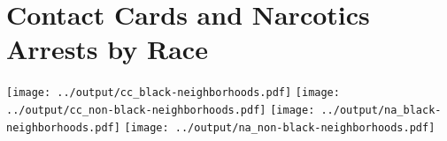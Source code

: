 \documentclass[]{article}
\begin{document}
\section*{Contact Cards and Narcotics Arrests by Race}
\texttt{[image: ../output/cc\_black-neighborhoods.pdf]}
\texttt{[image: ../output/cc\_non-black-neighborhoods.pdf]}
\texttt{[image: ../output/na\_black-neighborhoods.pdf]}
\texttt{[image: ../output/na\_non-black-neighborhoods.pdf]}
\end{document}
